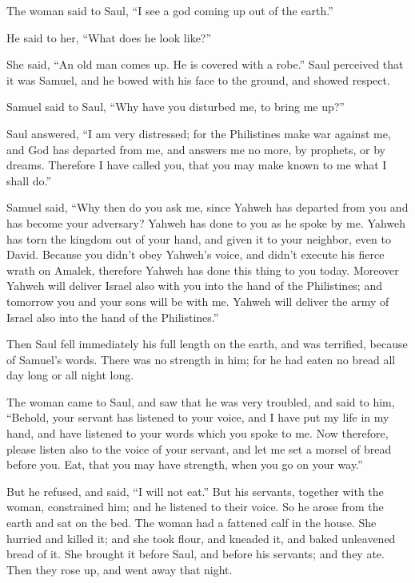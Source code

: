 {\par }{\PP The woman said to Saul, “I see a god coming up out of the earth.”
\par }{\PP {}He said to her, “What does he look like?”
\par }{\PP She said, “An old man comes up. He is covered with a robe.” Saul perceived that it was Samuel, and he bowed with his face to the ground, and showed respect.
\par }{\PP {}Samuel said to Saul, “Why have you disturbed me, to bring me up?”
\par }{\PP Saul answered, “I am very distressed; for the Philistines make war against me, and God has departed from me, and answers me no more, by prophets, or by dreams. Therefore I have called you, that you may make known to me what I shall do.”
\par }{\PP {}Samuel said, “Why then do you ask me, since Yahweh has departed from you and has become your adversary?
Yahweh has done to you as he spoke by me. Yahweh has torn the kingdom out of your hand, and given it to your neighbor, even to David.
Because you didn’t obey Yahweh’s voice, and didn’t execute his fierce wrath on Amalek, therefore Yahweh has done this thing to you today.
Moreover Yahweh will deliver Israel also with you into the hand of the Philistines; and tomorrow you and your sons will be with me. Yahweh will deliver the army of Israel also into the hand of the Philistines.”
\par }{\PP {}Then Saul fell immediately his full length on the earth, and was terrified, because of Samuel’s words. There was no strength in him; for he had eaten no bread all day long or all night long.
\par }{\PP {}The woman came to Saul, and saw that he was very troubled, and said to him, “Behold, your servant has listened to your voice, and I have put my life in my hand, and have listened to your words which you spoke to me.
Now therefore, please listen also to the voice of your servant, and let me set a morsel of bread before you. Eat, that you may have strength, when you go on your way.”
\par }{\PP {}But he refused, and said, “I will not eat.” But his servants, together with the woman, constrained him; and he listened to their voice. So he arose from the earth and sat on the bed.
The woman had a fattened calf in the house. She hurried and killed it; and she took flour, and kneaded it, and baked unleavened bread of it.
She brought it before Saul, and before his servants; and they ate. Then they rose up, and went away that night.

}
